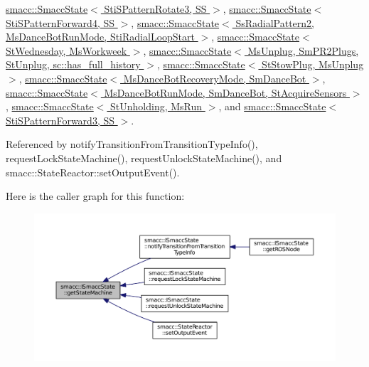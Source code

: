 \hyperlink{classsmacc_1_1SmaccState_afc39f8e0ca4001b2159a100da2fccd0e}{smacc\+::\+Smacc\+State$<$ Sti\+S\+Pattern\+Rotate3, S\+S $>$}, \hyperlink{classsmacc_1_1SmaccState_afc39f8e0ca4001b2159a100da2fccd0e}{smacc\+::\+Smacc\+State$<$ Sti\+S\+Pattern\+Forward4, S\+S $>$}, \hyperlink{classsmacc_1_1SmaccState_afc39f8e0ca4001b2159a100da2fccd0e}{smacc\+::\+Smacc\+State$<$ Ss\+Radial\+Pattern2, Ms\+Dance\+Bot\+Run\+Mode, Sti\+Radial\+Loop\+Start $>$}, \hyperlink{classsmacc_1_1SmaccState_afc39f8e0ca4001b2159a100da2fccd0e}{smacc\+::\+Smacc\+State$<$ St\+Wednesday, Ms\+Workweek $>$}, \hyperlink{classsmacc_1_1SmaccState_afc39f8e0ca4001b2159a100da2fccd0e}{smacc\+::\+Smacc\+State$<$ Ms\+Unplug, Sm\+P\+R2\+Plugs, St\+Unplug, sc\+::has\+\_\+full\+\_\+history $>$}, \hyperlink{classsmacc_1_1SmaccState_afc39f8e0ca4001b2159a100da2fccd0e}{smacc\+::\+Smacc\+State$<$ St\+Stow\+Plug, Ms\+Unplug $>$}, \hyperlink{classsmacc_1_1SmaccState_afc39f8e0ca4001b2159a100da2fccd0e}{smacc\+::\+Smacc\+State$<$ Ms\+Dance\+Bot\+Recovery\+Mode, Sm\+Dance\+Bot $>$}, \hyperlink{classsmacc_1_1SmaccState_afc39f8e0ca4001b2159a100da2fccd0e}{smacc\+::\+Smacc\+State$<$ Ms\+Dance\+Bot\+Run\+Mode, Sm\+Dance\+Bot, St\+Acquire\+Sensors $>$}, \hyperlink{classsmacc_1_1SmaccState_afc39f8e0ca4001b2159a100da2fccd0e}{smacc\+::\+Smacc\+State$<$ St\+Unholding, Ms\+Run $>$}, and \hyperlink{classsmacc_1_1SmaccState_afc39f8e0ca4001b2159a100da2fccd0e}{smacc\+::\+Smacc\+State$<$ Sti\+S\+Pattern\+Forward3, S\+S $>$}.



Referenced by notify\+Transition\+From\+Transition\+Type\+Info(), request\+Lock\+State\+Machine(), request\+Unlock\+State\+Machine(), and smacc\+::\+State\+Reactor\+::set\+Output\+Event().



Here is the caller graph for this function\+:
\nopagebreak
\begin{figure}[H]
\begin{center}
\leavevmode
\includegraphics[width=350pt]{classsmacc_1_1ISmaccState_a562bb3f9a3ac16b8be71e4794c9e7523_icgraph}
\end{center}
\end{figure}


